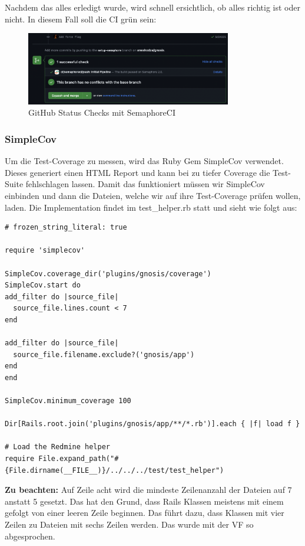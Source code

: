 \newpage
Nachdem das alles erledigt wurde, wird schnell ersichtlich, ob alles richtig ist oder nicht. In diesem Fall soll die CI
grün sein:
\begin{figure}[H]
  \centering
  \includegraphics[width=0.8\textwidth]{images/misc/ci-passed.png}
  \caption[Screenshot des GitHub Status Checks, worauf SemaphoreCI sichtbar ist]{GitHub Status Checks mit SemaphoreCI}
  \label{fig:semaphore_ci_passed}
\end{figure}

\subsubsection{SimpleCov}
Um die Test-Coverage zu messen, wird das Ruby Gem SimpleCov verwendet. Dieses generiert einen HTML Report und kann bei
zu tiefer Coverage die Test-Suite fehlschlagen lassen. \newline
Damit das funktioniert müssen wir SimpleCov einbinden und dann die Dateien, welche wir
auf ihre Test-Coverage prüfen wollen, laden. \newline
Die Implementation findet im test\_helper.rb statt und sieht wie folgt aus:
\begin{codebox}[]
  \begin{verbatim}
# frozen_string_literal: true

require 'simplecov'

SimpleCov.coverage_dir('plugins/gnosis/coverage')
SimpleCov.start do
add_filter do |source_file|
  source_file.lines.count < 7
end

add_filter do |source_file|
  source_file.filename.exclude?('gnosis/app')
end
end

SimpleCov.minimum_coverage 100

Dir[Rails.root.join('plugins/gnosis/app/**/*.rb')].each { |f| load f }

# Load the Redmine helper
require File.expand_path("#{File.dirname(__FILE__)}/../../../test/test_helper")
  \end{verbatim}
\end{codebox}
\textbf{Zu beachten:} Auf Zeile acht wird die mindeste Zeilenanzahl der Dateien auf 7 anstatt 5 gesetzt. Das hat den
Grund, dass Rails Klassen meistens mit einem  gefolgt von einer
leeren Zeile beginnen. Das führt dazu, dass Klassen mit vier Zeilen zu Dateien mit sechs Zeilen werden. Das wurde mit
der VF so abgesprochen. \newline

